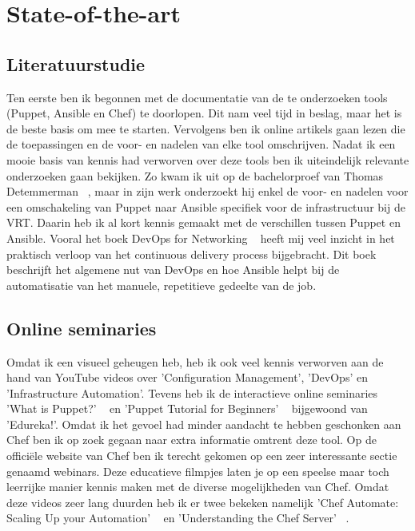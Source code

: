 \documentclass[fleqn,10pt]{voorstel}
\begin{document}

\section{State-of-the-art}
\label{sec:state-of-the-art}

\subsection{Literatuurstudie}
Ten eerste ben ik begonnen met de documentatie van de te onderzoeken tools (Puppet, Ansible en Chef) te doorlopen. Dit nam veel tijd in beslag, maar het is de beste basis om mee te starten. Vervolgens ben ik online artikels gaan lezen die de toepassingen en de voor- en nadelen van elke tool omschrijven. Nadat ik een mooie basis van kennis had verworven over deze tools ben ik uiteindelijk relevante onderzoeken gaan bekijken. Zo kwam ik uit op de bachelorproef van Thomas Detemmerman ~\autocite{Detemmermanthomas2017}, maar in zijn werk onderzoekt hij enkel de voor- en nadelen voor een omschakeling van Puppet naar Ansible specifiek voor de infrastructuur bij de VRT. Daarin heb ik al kort kennis gemaakt met de verschillen tussen Puppet en Ansible. Vooral het boek DevOps for Networking ~\autocite{ArmstrongSteven2016} heeft mij veel inzicht in het praktisch verloop van het continuous delivery process bijgebracht. Dit boek beschrijft het algemene nut van DevOps en hoe Ansible helpt bij de automatisatie van het manuele, repetitieve gedeelte van de job.

\subsection{Online seminaries}
Omdat ik een visueel geheugen heb, heb ik ook veel kennis verworven aan de hand van YouTube videos over 'Configuration Management', 'DevOps' en 'Infrastructure Automation'. Tevens heb ik de interactieve online seminaries 'What is Puppet?' ~\autocite{puppet1} en 'Puppet Tutorial for Beginners' ~\autocite{puppet2} bijgewoond van 'Edureka!'. Omdat ik het gevoel had minder aandacht te hebben geschonken aan Chef ben ik op zoek gegaan naar extra informatie omtrent deze tool. Op de officiële website van Chef ben ik terecht gekomen op een zeer interessante sectie genaamd webinars. Deze educatieve filmpjes laten je op een speelse maar toch leerrijke manier kennis maken met de diverse mogelijkheden van Chef. Omdat deze videos zeer lang duurden heb ik er twee bekeken namelijk 'Chef Automate: Scaling Up your Automation' ~\autocite{chef1} en 'Understanding the Chef Server' ~\autocite{chef2}.
\end{document}
